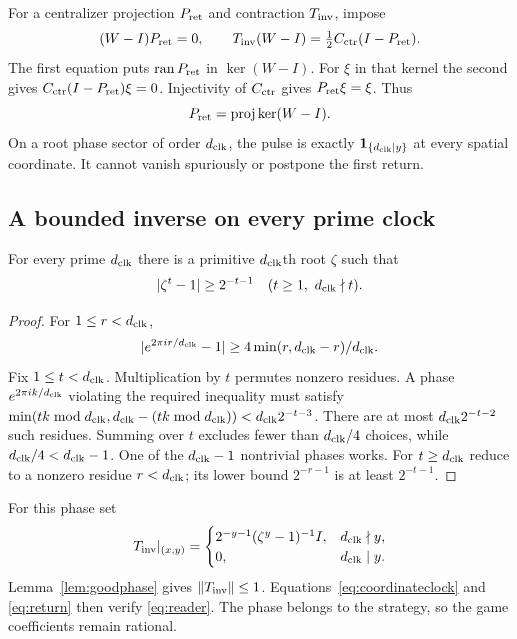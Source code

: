 For a centralizer projection $P_{\rm ret}$ and contraction $T_{\rm inv}$, impose
\begin{equation}\label{eq:reader}
 (W-I)P_{\rm ret}=0,\qquad T_{\rm inv}(W-I)=\tfrac12 C_{\rm ctr}(I-P_{\rm ret}).
\end{equation}
The first equation puts $\operatorname{ran} P_{\rm ret}$ in $\ker(W-I)$. For $\xi$ in that kernel the second gives $C_{\rm ctr}(I-P_{\rm ret})\xi=0$. Injectivity of $C_{\rm ctr}$ gives $P_{\rm ret}\xi=\xi$. Thus
\begin{equation}\label{eq:return}
 P_{\rm ret}=\operatorname{proj}\ker(W-I).
\end{equation}
On a root phase sector of order ${d_{\rm clk}}$, the pulse is exactly $\mathbf1_{\{{d_{\rm clk}}\mid y\}}$ at every spatial coordinate. It cannot vanish spuriously or postpone the first return.

\subsection{A bounded inverse on every prime clock}
\begin{lemma}\label{lem:goodphase}
For every prime ${d_{\rm clk}}$ there is a primitive ${d_{\rm clk}}$th root $\zeta$ such that
\[
 |\zeta^t-1|\geq2^{-t-1}\quad(t\geq1,\ {d_{\rm clk}}\nmid t).
\]
\end{lemma}
\begin{proof}
For $1\leq r<{d_{\rm clk}}$,
\[
 |e^{2\pi ir/{d_{\rm clk}}}-1|\geq4\min(r,{d_{\rm clk}}-r)/{d_{\rm clk}}.
\]
Fix $1\leq t<{d_{\rm clk}}$. Multiplication by $t$ permutes nonzero residues. A phase $e^{2\pi ik/{d_{\rm clk}}}$ violating the required inequality must satisfy $\min(tk\bmod {d_{\rm clk}},{d_{\rm clk}}-(tk\bmod {d_{\rm clk}}))<{d_{\rm clk}}2^{-t-3}$. There are at most ${d_{\rm clk}}2^{-t-2}$ such residues. Summing over $t$ excludes fewer than ${d_{\rm clk}}/4$ choices, while ${d_{\rm clk}}/4<{d_{\rm clk}}-1$. One of the ${d_{\rm clk}}-1$ nontrivial phases works. For $t\geq {d_{\rm clk}}$ reduce to a nonzero residue $r<{d_{\rm clk}}$; its lower bound $2^{-r-1}$ is at least $2^{-t-1}$.
\end{proof}

For this phase set
\begin{equation}\label{eq:D}
 T_{\rm inv}|_{(x,y)}=
 \begin{cases}
 2^{-y-1}(\zeta^y-1)^{-1}I,&{d_{\rm clk}}\nmid y,\\
 0,&{d_{\rm clk}}\mid y.
 \end{cases}
\end{equation}
Lemma~\ref{lem:goodphase} gives $\|T_{\rm inv}\|\leq1$. Equations~\eqref{eq:coordinateclock} and \eqref{eq:return} then verify \eqref{eq:reader}. The phase belongs to the strategy, so the game coefficients remain rational.
